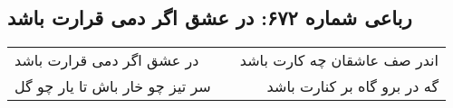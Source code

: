 \begin{center}
\section*{رباعی شماره ۶۷۲: در عشق اگر دمی قرارت باشد}
\label{sec:0672}
\begin{longtable}{l p{0.5cm} r}
در عشق اگر دمی قرارت باشد
&&
اندر صف عاشقان چه کارت باشد
\\
سر تیز چو خار باش تا یار چو گل
&&
گه در برو گاه بر کنارت باشد
\\
\end{longtable}
\end{center}
